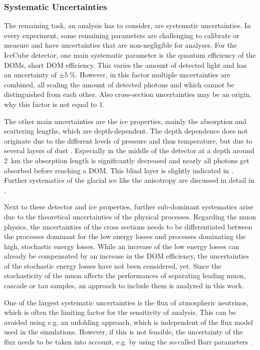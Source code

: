 \subsubsection{Systematic Uncertainties}

The remaining task, an analysis has to consider, are systematic uncertainties.
In every experiment, some remaining parameters are challenging to calibrate or measure and have uncertainties that are non-negligible for analyses.
For the IceCube detector, one main systematic parameter is the quantum efficiency of the DOMs, short DOM efficiency.
This varies the amount of detected light and has an uncertainty of $\pm\SI{5}{\percent}$.
However, in this factor multiple uncertainties are combined, all scaling the amount of detected photons and which cannot be distinguished from each other.
Also cross-section uncertainties may be an origin, why this factor is not equal to 1.

The other main uncertainties are the ice properties, mainly the absorption and scattering lengths, which are depth-dependent.
The depth dependence does not originate due to the different levels of pressure and thus temperature, but due to several layers of dust \cite{Icecube06ice, Icecube13ice}.
Especially in the middle of the detector at a depth around \SI{2}{km} the absorption length is significantly decreased and nearly all photons get absorbed before reaching a DOM.
This blind layer is slightly indicated in .
Further systematics of the glacial ice like the anisotropy are discussed in detail in \cite{Rongen19PhD}.

Next to these detector and ice properties, further sub-dominant systematics arise due to the theoretical uncertainties of the physical processes.
Regarding the muon physics, the uncertainties of the cross sections needs to be differentiated between the processes dominant for the low energy losses and processes dominating the high, stochastic energy losses.
While an increase of the low energy losses can already be compensated by an increase in the DOM efficiency, the uncertainties of the stochastic energy losses have not been considered, yet.
Since the stochasticity of the muon affects the performances of separating leading muon, cascade or tau samples, an approach to include them is analyzed in this work.

One of the largest systematic uncertainties is the flux of atmospheric neutrinos, which is often the limiting factor for the sensitivity of analysis.
This can be avoided using e.g. an unfolding approach, which is independent of the flux model used in the simulations.
However, if this is not feasible, the uncertainty of the flux needs to be taken into account, e.g. by using the so-called Barr parameters \cite{Barr06}.

